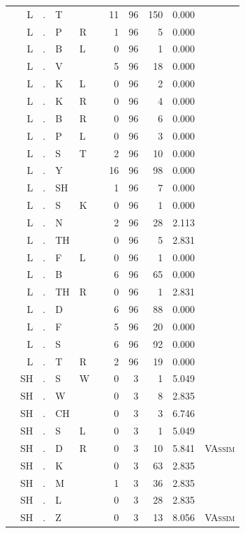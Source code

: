 \documentclass[12pt]{article}
\begin{document}
\begin{longtable}{r@{ } r@{ } c@{ } l@{ } l@{ } l@{ } r r r r l }
 & L & . & T &  &  & 11 & 96 & 150 & 0.000 &  \\
 & L & . & P & R &  & 1 & 96 & 5 & 0.000 &  \\
 & L & . & B & L &  & 0 & 96 & 1 & 0.000 &  \\
 & L & . & V &  &  & 5 & 96 & 18 & 0.000 &  \\
 & L & . & K & L &  & 0 & 96 & 2 & 0.000 &  \\
 & L & . & K & R &  & 0 & 96 & 4 & 0.000 &  \\
 & L & . & B & R &  & 0 & 96 & 6 & 0.000 &  \\
 & L & . & P & L &  & 0 & 96 & 3 & 0.000 &  \\
 & L & . & S & T &  & 2 & 96 & 10 & 0.000 &  \\
 & L & . & Y &  &  & 16 & 96 & 98 & 0.000 &  \\
 & L & . & SH &  &  & 1 & 96 & 7 & 0.000 &  \\
 & L & . & S & K &  & 0 & 96 & 1 & 0.000 &  \\
 & L & . & N &  &  & 2 & 96 & 28 & 2.113 &  \\
 & L & . & TH &  &  & 0 & 96 & 5 & 2.831 &  \\
 & L & . & F & L &  & 0 & 96 & 1 & 0.000 &  \\
 & L & . & B &  &  & 6 & 96 & 65 & 0.000 &  \\
 & L & . & TH & R &  & 0 & 96 & 1 & 2.831 &  \\
 & L & . & D &  &  & 6 & 96 & 88 & 0.000 &  \\
 & L & . & F &  &  & 5 & 96 & 20 & 0.000 &  \\
 & L & . & S &  &  & 6 & 96 & 92 & 0.000 &  \\
 & L & . & T & R &  & 2 & 96 & 19 & 0.000 &  \\
 & SH & . & S & W &  & 0 & 3 & 1 & 5.049 &  \\
 & SH & . & W &  &  & 0 & 3 & 8 & 2.835 &  \\
 & SH & . & CH &  &  & 0 & 3 & 3 & 6.746 &  \\
 & SH & . & S & L &  & 0 & 3 & 1 & 5.049 &  \\
 & SH & . & D & R &  & 0 & 3 & 10 & 5.841 & \textsc{VAssim} \\
 & SH & . & K &  &  & 0 & 3 & 63 & 2.835 &  \\
 & SH & . & M &  &  & 1 & 3 & 36 & 2.835 &  \\
 & SH & . & L &  &  & 0 & 3 & 28 & 2.835 &  \\
 & SH & . & Z &  &  & 0 & 3 & 13 & 8.056 & \textsc{VAssim} \\

\end{longtable}
\end{document}
